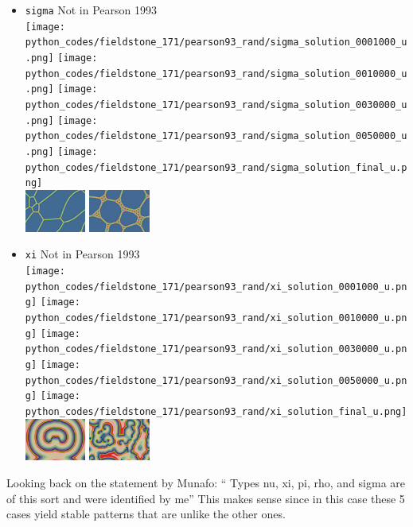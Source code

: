 \begin{itemize}
\item {\tt sigma} Not in Pearson 1993\\
\texttt{[image: python\_codes/fieldstone\_171/pearson93\_rand/sigma\_solution\_0001000\_u.png]}
\texttt{[image: python\_codes/fieldstone\_171/pearson93\_rand/sigma\_solution\_0010000\_u.png]}
\texttt{[image: python\_codes/fieldstone\_171/pearson93\_rand/sigma\_solution\_0030000\_u.png]}
\texttt{[image: python\_codes/fieldstone\_171/pearson93\_rand/sigma\_solution\_0050000\_u.png]}
\texttt{[image: python\_codes/fieldstone\_171/pearson93\_rand/sigma\_solution\_final\_u.png]}\\
\includegraphics[height=1.4cm]{python_codes/fieldstone_171/images/munafo_sigma1}
\includegraphics[height=1.4cm]{python_codes/fieldstone_171/images/munafo_sigma2}

\item {\tt xi} Not in Pearson 1993\\
\texttt{[image: python\_codes/fieldstone\_171/pearson93\_rand/xi\_solution\_0001000\_u.png]}
\texttt{[image: python\_codes/fieldstone\_171/pearson93\_rand/xi\_solution\_0010000\_u.png]}
\texttt{[image: python\_codes/fieldstone\_171/pearson93\_rand/xi\_solution\_0030000\_u.png]}
\texttt{[image: python\_codes/fieldstone\_171/pearson93\_rand/xi\_solution\_0050000\_u.png]}
\texttt{[image: python\_codes/fieldstone\_171/pearson93\_rand/xi\_solution\_final\_u.png]}\\
\includegraphics[height=1.4cm]{python_codes/fieldstone_171/images/munafo_xi1}
\includegraphics[height=1.4cm]{python_codes/fieldstone_171/images/munafo_xi2}

\end{itemize}

Looking back on the statement by Munafo: ``
Types nu, xi, pi, rho, and sigma are of this sort and were identified by me''
This makes sense since in this case these 5 cases yield stable patterns 
that are unlike the other ones.




